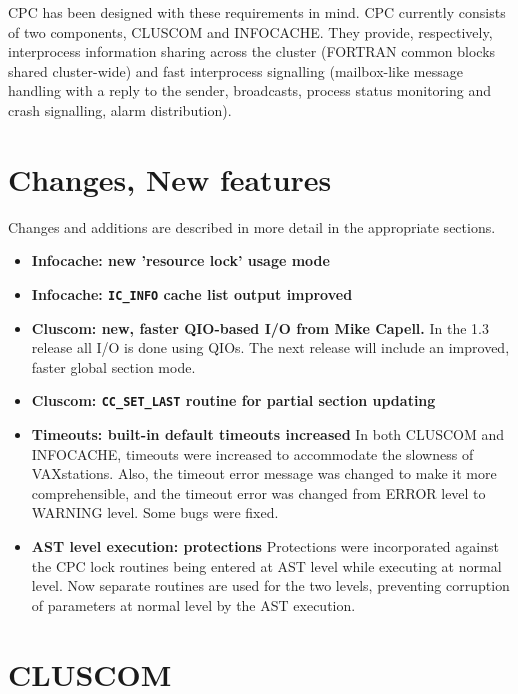 CPC has been designed with these requirements in mind.
CPC currently consists of two components, CLUSCOM and INFOCACHE.
They provide, respectively, interprocess information sharing across
the cluster (FORTRAN common blocks shared cluster-wide) and
fast interprocess signalling (mailbox-like message handling with a
reply to the sender, broadcasts, process status monitoring and
crash signalling, alarm distribution).

\section{Changes, New features}

Changes and additions are described in more detail in the appropriate
sections.

\begin{itemize}

\item{ \bf Infocache: new 'resource lock' usage mode}

\item{ \bf Infocache: {\tt IC\_INFO} cache list output improved}

\item{ \bf Cluscom: new, faster QIO-based I/O from Mike Capell. }
In the 1.3 release all I/O
is done using QIOs. The next release will include an improved, faster
global section mode.

\item{ \bf Cluscom: {\tt CC\_SET\_LAST} routine for partial section updating}

\item{ \bf Timeouts: built-in default timeouts increased}
In both CLUSCOM and INFOCACHE, timeouts were increased to accommodate the
slowness of VAXstations. Also, the timeout error message was changed to
make it more comprehensible, and the timeout error was changed from
ERROR level to WARNING level. Some bugs were fixed.

\item{ \bf AST level execution: protections}
Protections were incorporated against the CPC lock routines being entered
at AST level while executing at normal level. Now separate routines
are used for the two levels, preventing corruption of
parameters at normal level by the AST execution.

\end{itemize}

\section{CLUSCOM}

